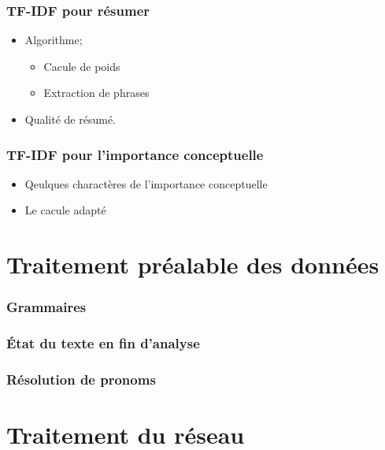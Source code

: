 \documentclass[12pt, handout]{beamer}
\begin{document}
\begin{frame}
 \frametitle{TF-IDF pour résumer}
 \begin{itemize}
  \item Algorithme;
  	\begin{itemize}
  	\item Cacule de poids
  	\item Extraction de phrases
  	\end{itemize}
  \item Qualité de résumé.
 \end{itemize}
 
\end{frame}


\begin{frame}
 \frametitle{TF-IDF pour l'importance conceptuelle}
 \begin{itemize}
  	\item Qeulques charactères de l'importance conceptuelle
  	\item Le cacule adapté
  \end{itemize}
 
\end{frame}


\section{Traitement préalable des données}


\begin{frame}
 \frametitle{Grammaires}
 
 
\end{frame}

\begin{frame}
 \frametitle{État du texte en fin d'analyse}
 
 
\end{frame}


\begin{frame}[allowframebreaks = 0.7]
 \frametitle{Résolution de pronoms}
 
 
\end{frame}


\section{Traitement du réseau}
\end{document}
